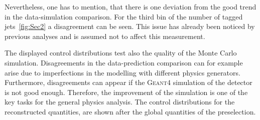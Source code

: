 Nevertheless, one has to mention, that there is one deviation from the good trend in the data-simulation comparison. For the third bin of the number of tagged jets~\cref{fig:Sec2} a  disagreement can be seen. This issue has already been noticed by previous analyses and is assumed not to affect this measurement.

The displayed control distributions test also the quality of the Monte Carlo simulation.
Disagreements in the data-prediction comparison can for example  arise due to imperfections in the  modelling  with different physics generators. Furthermore, disagreements can appear if the \textsc{Geant4} simulation of the detector is not good enough. Therefore, the improvement of the simulation is one of the key tasks for the general physics analysis. 
The control distributions for the reconstructed quantities, are shown after the global quantities of the preselection.





\clearpage

